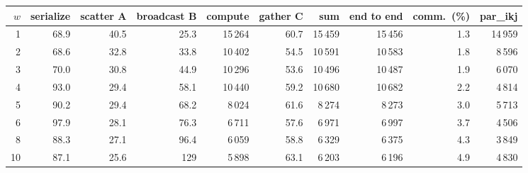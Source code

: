 \begin{tabular}{rrrrrrrrrr}
\toprule
$w$ & serialize & scatter A & broadcast B & compute & gather C & sum & end to end & comm.\ (\%) & par\_ikj \\
\midrule
1 & 68.9 & 40.5 & 25.3 & 15\,264 & 60.7 & 15\,459 & 15\,456 & 1.3 & 14\,959 \\
2 & 68.6 & 32.8 & 33.8 & 10\,402 & 54.5 & 10\,591 & 10\,583 & 1.8 & 8\,596 \\
3 & 70.0 & 30.8 & 44.9 & 10\,296 & 53.6 & 10\,496 & 10\,487 & 1.9 & 6\,070 \\
4 & 93.0 & 29.4 & 58.1 & 10\,440 & 59.2 & 10\,680 & 10\,682 & 2.2 & 4\,814 \\
5 & 90.2 & 29.4 & 68.2 & 8\,024 & 61.6 & 8\,274 & 8\,273 & 3.0 & 5\,713 \\
6 & 97.9 & 28.1 & 76.3 & 6\,711 & 57.6 & 6\,971 & 6\,997 & 3.7 & 4\,506 \\
8 & 88.3 & 27.1 & 96.4 & 6\,059 & 58.8 & 6\,329 & 6\,375 & 4.3 & 3\,849 \\
10 & 87.1 & 25.6 & 129 & 5\,898 & 63.1 & 6\,203 & 6\,196 & 4.9 & 4\,830 \\
\bottomrule
\end{tabular}
\par{}
